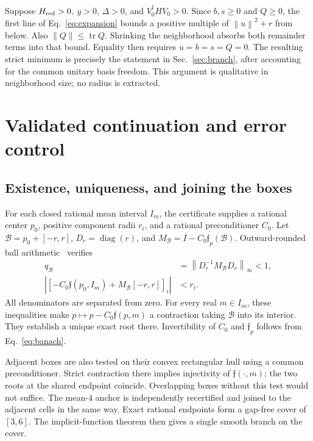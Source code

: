 \documentclass[aps,pra,reprint,amsmath,amssymb,longbibliography]{revtex4-2}
\newcommand{\tr}{\operatorname{tr}}
\newcommand{\diag}{\operatorname{diag}}
\newcommand{\norm}[1]{\left\lVert#1\right\rVert}
\begin{document}
Suppose $H_{\rm red}>0$, $y>0$, $\Delta>0$, and $V_0^\dagger HV_0>0$. Since $b,s\ge0$ and $Q\ge0$, the first line of Eq.~\eqref{eq:expansion} bounds a positive multiple of $\norm{u}^2+r$ from below. Also $\norm{Q}\le\tr Q$. Shrinking the neighborhood absorbs both remainder terms into that bound. Equality then requires $u=b=s=Q=0$. The resulting strict minimum is precisely the statement in Sec.~\ref{sec:branch}, after accounting for the common unitary basis freedom. This argument is qualitative in neighborhood size; no radius is extracted.

\section{Validated continuation and error control}\label{sec:certificate}
\subsection{Existence, uniqueness, and joining the boxes}
For each closed rational mean interval $I_m$, the certificate supplies a rational center $p_0$, positive component radii $r_i$, and a rational preconditioner $C_0$. Let $\mathcal B=p_0+[-r,r]$, $D_r=\diag(r)$, and $M_{\mathcal B}=I-C_0\mathfrak f_p(\mathcal B)$. Outward-rounded ball arithmetic~\cite{Johansson2016} verifies
\begin{align}
 q_{\mathcal B}&=\norm{D_r^{-1}M_{\mathcal B}D_r}_\infty<1,
 \label{eq:banach}\\
 \left|\left[-C_0\mathfrak f(p_0,I_m)
 +M_{\mathcal B}[-r,r]\right]_i\right|&<r_i.
 \label{eq:inclusion}
\end{align}
All denominators are separated from zero. For every real $m\in I_m$, these inequalities make $p\mapsto p-C_0\mathfrak f(p,m)$ a contraction taking $\mathcal B$ into its interior. They establish a unique exact root there. Invertibility of $C_0$ and $\mathfrak f_p$ follows from Eq.~\eqref{eq:banach}.

Adjacent boxes are also tested on their convex rectangular hull using a common preconditioner. Strict contraction there implies injectivity of $\mathfrak f(\cdot,m)$; the two roots at the shared endpoint coincide. Overlapping boxes without this test would not suffice. The mean-$4$ anchor is independently recertified and joined to the adjacent cells in the same way. Exact rational endpoints form a gap-free cover of $[3,6]$. The implicit-function theorem then gives a single smooth branch on the cover.
\end{document}
